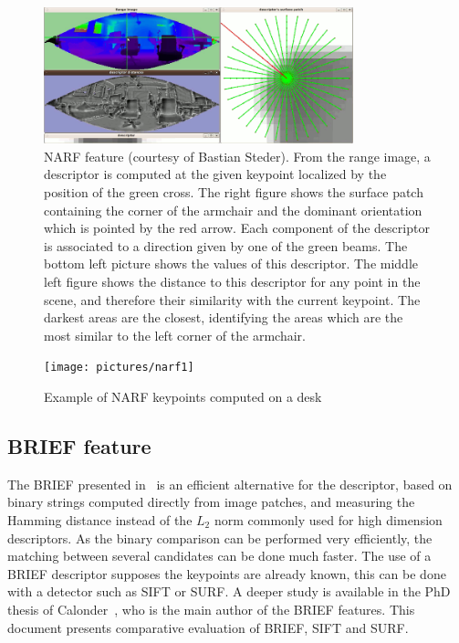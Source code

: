 \begin{figure}[H]
\centering
\includegraphics[width=0.8\textwidth]{figures/narf_descriptor_visualization}
\caption{NARF feature (courtesy of Bastian Steder). From the range image, a descriptor is computed at the given keypoint localized by the position of the green cross. The right figure shows the surface patch containing the corner of the armchair and the dominant orientation which is pointed by the red arrow. Each component of the descriptor is associated to a direction given by one of the green beams. The bottom left picture shows the values of this descriptor. The middle left figure shows the distance to this descriptor for any point in the scene, and therefore their similarity with the current keypoint. The darkest areas are the closest, identifying the areas which are the most similar to the left corner of the armchair.}
\end{figure}

\begin{figure}[H]
\centering
\texttt{[image: pictures/narf1]}
\caption{Example of NARF keypoints computed on a desk}
\end{figure}

\subsection{BRIEF feature}

The \gls{BRIEF} presented in~\cite{Calonder10-brief} is an efficient alternative for the descriptor, based on binary strings computed directly from image patches, and measuring the Hamming distance instead of the $L_2$ norm commonly used for high dimension descriptors. As the binary comparison can be performed very efficiently, the matching between several candidates can be done much faster. The use of a \gls{BRIEF} descriptor supposes the keypoints are already known, this can be done with a detector such as \gls{SIFT} or \gls{SURF}. A deeper study is available in the PhD thesis of Calonder~\cite{Calonder10_PhD}, who is the main author of the \gls{BRIEF} features. This document presents comparative evaluation of \gls{BRIEF}, \gls{SIFT} and \gls{SURF}. 

